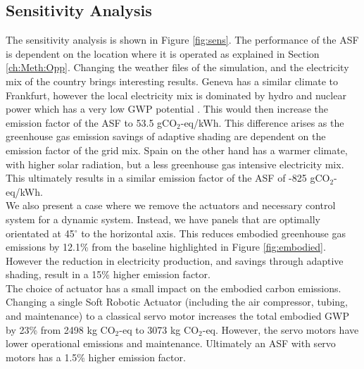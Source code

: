 
\subsection{Sensitivity Analysis}


The sensitivity analysis is shown in Figure \ref{fig:sens}. The performance of the ASF is dependent on the location where it is operated as explained in Section \ref{ch:Meth:Opp}. Changing the weather files of the simulation, and the electricity mix of the country brings interesting results. Geneva has a similar climate to Frankfurt, however the local electricity mix is dominated by hydro and nuclear power which has a very low GWP potential \cite{itten2012life}. This would then increase the emission factor of the ASF to 53.5 gCO$_{2}$-eq/kWh. This difference arises as the greenhouse gas emission savings of adaptive shading are dependent on the emission factor of the grid mix.
Spain on the other hand has a warmer climate, with higher solar radiation, but a less greenhouse gas intensive electricity mix. This ultimately results in a similar emission factor of the ASF of -825 gCO$_{2}$-eq/kWh.\\


We also present a case where we remove the actuators and necessary control system for a dynamic system. Instead, we have panels that are optimally orientated at 45$^{\circ}$ to the horizontal axis. This reduces embodied greenhouse gas emissions by 12.1\% from the baseline highlighted in Figure \ref{fig:embodied}. However the reduction in electricity production, and savings through adaptive shading, result in a 15\% higher emission factor.\\

The choice of actuator has a small impact on the embodied carbon emissions. Changing a single Soft Robotic Actuator (including the air compressor, tubing, and maintenance) to a classical servo motor increases the total embodied GWP by 23\% from 2498 kg CO$_{2}$-eq to 3073 kg CO$_{2}$-eq. However, the servo motors have lower operational emissions and maintenance. Ultimately an ASF with servo motors has a 1.5\% higher emission factor. \\

